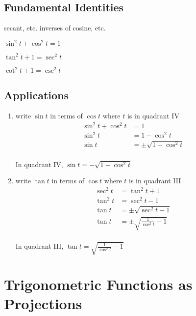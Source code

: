 \documentclass{exam}
\begin{document}
  \subsection{Fundamental Identities}
  \begin{itemize*}
    \item secant, etc. inverses of cosine, etc.
    \item $\sin^2 t + \cos^2 t = 1$
    \item $\tan^2 t + 1 = \sec^2 t$
    \item $\cot^2 t + 1 = \csc^2 t$
  \end{itemize*}

  \subsection{Applications}

  \begin{enumerate}
    \item write $\sin t$ in terms of $\cos t$ where $t$ is in quadrant IV
      \begin{align*}
        \sin^2 t + \cos^2 t & = 1 \\
        \sin^2 t            & = 1 - \cos^2 t \\
        \sin t              & = \pm \sqrt{ 1 - \cos^2 t } \\
      \end{align*}

      In quadrant IV, $\sin t = - \sqrt{ 1 - \cos^2 t }$ 

    \item write $\tan t$ in terms of $\cos t$ where $t$ is in quadrant III
      \begin{align*}
        \sec^2 t & = \tan^2 t + 1 \\
        \tan^2 t & = \sec^2 t - 1 \\
        \tan t   & = \pm \sqrt{ \sec^2 t - 1 } \\
        \tan t   & = \pm \sqrt{ \frac{1}{\cos^2 t} - 1 } \\
      \end{align*}

      In quadrant III, $\tan t = \sqrt{ \frac{1}{\cos^2 t} - 1 }$ 

  \end{enumerate}

  \section{Trigonometric Functions as Projections}
\end{document}
